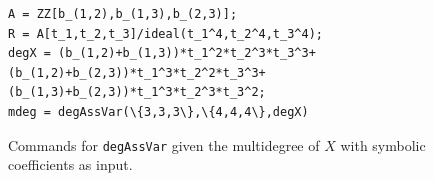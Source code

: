 \documentclass[12pt]{article}
\theoremstyle{definition}
\begin{document}
\begin{figure}[h]
\centering
\begin{tcolorbox}[size=fbox,width=\linewidth,colback=blue!5!white,colframe=blue!75!black]
\begin{Verbatim}[fontsize=\small,commandchars=\\\{\}]
A = ZZ[b_(1,2),b_(1,3),b_(2,3)];
R = A[t_1,t_2,t_3]/ideal(t_1^4,t_2^4,t_3^4);
degX = (b_(1,2)+b_(1,3))*t_1^2*t_2^3*t_3^3+(b_(1,2)+b_(2,3))*t_1^3*t_2^2*t_3^3+
(b_(1,3)+b_(2,3))*t_1^3*t_2^3*t_3^2;
mdeg = degAssVar(\{3,3,3\},\{4,4,4\},degX)
\end{Verbatim}
\end{tcolorbox}
\caption{Commands for {\tt degAssVar} given the multidegree of $X$ with symbolic coefficients as input.}\label{fig: degAssVar complete intersection}
\end{figure}
\end{document}
